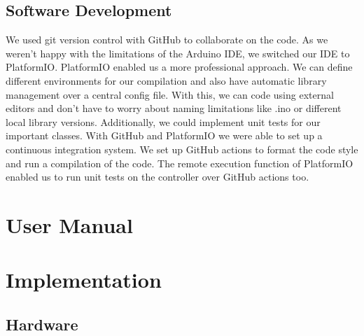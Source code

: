 \documentclass{article}
\begin{document}
\subsection{Software Development}
We used git version control with GitHub to collaborate on the code.
As we weren't happy with the limitations of the Arduino IDE, we switched our IDE to PlatformIO.
PlatformIO enabled us a more professional approach. We can define different environments for our compilation and also have automatic library management over a central config file.
With this, we can code using external editors and don't have to worry about naming limitations like .ino or different local library versions. Additionally, we could implement unit tests for our important classes.
With GitHub and PlatformIO we were able to set up a continuous integration system. We set up GitHub actions to format the code style and run a compilation of the code.
The remote execution function of PlatformIO enabled us to run unit tests on the controller over GitHub actions too.

\section{User Manual}
\lipsum[1]\lipsum[1]
\section{Implementation}
\subsection{Hardware}
\end{document}
